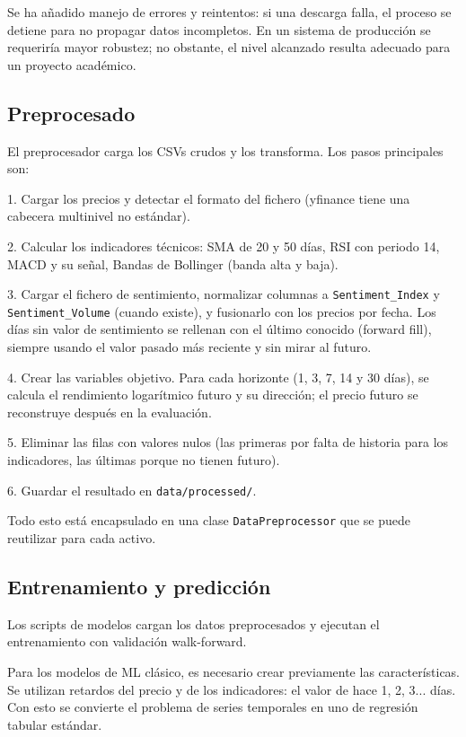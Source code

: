 Se ha añadido manejo de errores y reintentos: si una descarga falla, el proceso se detiene para no propagar datos incompletos. En un sistema de producción se requeriría mayor robustez; no obstante, el nivel alcanzado resulta adecuado para un proyecto académico.

\subsection{Preprocesado}

El preprocesador carga los CSVs crudos y los transforma. Los pasos principales son:

1. Cargar los precios y detectar el formato del fichero (yfinance tiene una cabecera multinivel no estándar).

2. Calcular los indicadores técnicos: SMA de 20 y 50 días, RSI con periodo 14, MACD y su señal, Bandas de Bollinger (banda alta y baja).

3. Cargar el fichero de sentimiento, normalizar columnas a \texttt{Sentiment\_Index} y \texttt{Sentiment\_Volume} (cuando existe), y fusionarlo con los precios por fecha. Los días sin valor de sentimiento se rellenan con el último conocido (forward fill), siempre usando el valor pasado más reciente y sin mirar al futuro.

4. Crear las variables objetivo. Para cada horizonte (1, 3, 7, 14 y 30 días), se calcula el rendimiento logarítmico futuro y su dirección; el precio futuro se reconstruye después en la evaluación.

5. Eliminar las filas con valores nulos (las primeras por falta de historia para los indicadores, las últimas porque no tienen futuro).

6. Guardar el resultado en \texttt{data/processed/}.

Todo esto está encapsulado en una clase \texttt{DataPreprocessor} que se puede reutilizar para cada activo.

\subsection{Entrenamiento y predicción}

Los scripts de modelos cargan los datos preprocesados y ejecutan el entrenamiento con validación walk-forward.

Para los modelos de ML clásico, es necesario crear previamente las características. Se utilizan retardos del precio y de los indicadores: el valor de hace 1, 2, 3... días. Con esto se convierte el problema de series temporales en uno de regresión tabular estándar.


